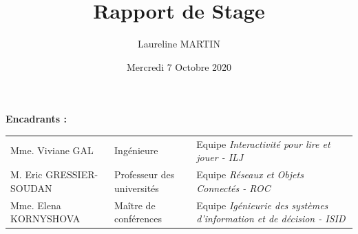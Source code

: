 \documentclass{article}
\title{Rapport de Stage}
\author{Laureline MARTIN}
\date{Mercredi 7 Octobre 2020}
\begin{document}
\maketitle
\vspace*{14cm}
\begin{center}
	\textbf{Encadrants :}
\end{center}
\begin{tabular}{p{4cm}p{4cm}p{8cm}}
	\hspace*{-1cm}
	Mme. Viviane GAL & Ingénieure & Equipe \textit{Interactivité pour lire et jouer - ILJ}\smallskip\\
	\hspace*{-1cm}
	M. Eric GRESSIER-SOUDAN & Professeur des universités & Equipe \textit{Réseaux et Objets Connectés - ROC}
	\smallskip\\
	\hspace*{-1cm}
	Mme. Elena KORNYSHOVA & Maître de conférences & Equipe \textit{Igénieurie des systèmes d'information et de décision - ISID}
\end{tabular}
\end{document}
